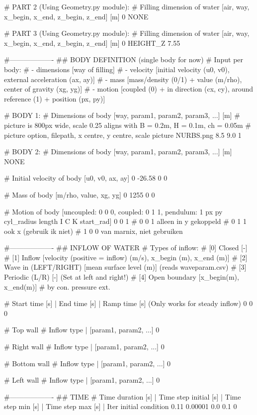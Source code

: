 # PART 2 (Using Geometry.py module):
# Filling dimension of water [air, way, x_begin, x_end, z_begin, z_end] [m]
0 NONE

# PART 3 (Using Geometry.py module):
# Filling dimension of water [air, way, x_begin, x_end, z_begin, z_end] [m]
0 HEIGHT_Z 7.55

#-------------------
## BODY DEFINITION (single body for now)
# Input per body:
# - dimensions      [way of filling]
# - velocity        [initial velocity (u0, v0), external acceleration (ax, ay)]
# - mass            [mass/density (0/1) + value (m/rho), center of gravity (xg, yg)]
# - motion          [coupled (0) + in direction (cx, cy), around reference (1) + position (px, py)]

# BODY 1:
# Dimensions of body [way, param1, param2, param3, ...] [m]
# picture is 800px wide, scale 0.25 aligns with B = 0.2m, H = 0.1m, ch = 0.05m
# picture option, filepath, x centre, y centre, scale
picture NURBS.png 8.5 9.0 1

# BODY 2:
# Dimensions of body [way, param1, param2, param3, ...] [m]
NONE

# Initial velocity of body [u0, v0, ax, ay]
0 -26.58 0 0

# Mass of body [m/rho, value, xg, yg]
0 1255 0 0

# Motion of body [uncoupled: 0 0 0, coupled: 0 1 1, pendulum: 1 px py cyl_radius length I C K start_rad]
0 0 1
# 0 0 1 alleen in y gekoppeld
# 0 1 1 ook x (gebruik ik niet)
# 1 0 0 van marnix, niet gebruiken

#-------------------
## INFLOW OF WATER
# Types of inflow:
# [0] Closed                [-]
# [1] Inflow                [velocity (positive = inflow) (m/s), x_begin (m), x_end (m)]
# [2] Wave in (LEFT/RIGHT)  [mean surface level (m)] (reads waveparam.csv)
# [3] Periodic (L/R)        [-] (Set at left and right!)
# [4] Open boundary         [x_begin(m), x_end(m)]
#     by con. pressure ext.

# Start time [s] | End time [s] | Ramp time [s] (Only works for steady inflow)
0 0 0

# Top wall
# Inflow type | [param1, param2, ...]
0

# Right wall
# Inflow type | [param1, param2, ...]
0

# Bottom wall
# Inflow type | [param1, param2, ...]
0

# Left wall
# Inflow type | [param1, param2, ...]
0

#-------------------
## TIME
# Time duration [s]	| Time step initial [s]		| Time step min [s]	| Time step max [s] | Iter initial condition
0.11 0.00001 0.0 0.1 0

